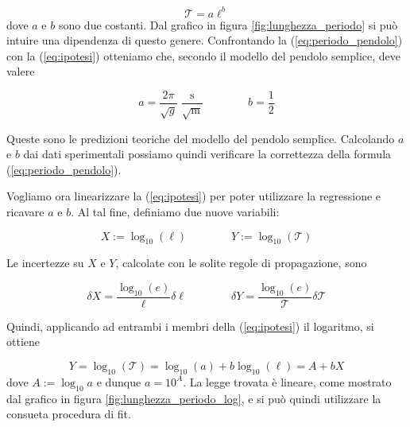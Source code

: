 \begin{equation}
    \mathcal{T} = a\ell^b
    \label{eq:ipotesi}
\end{equation}
%
dove $a$ e $b$ sono due costanti. Dal grafico in figura \ref{fig:lunghezza_periodo} si può intuire una dipendenza di questo genere.
Confrontando la (\ref{eq:periodo_pendolo}) con la (\ref{eq:ipotesi}) otteniamo che, secondo il modello
del pendolo semplice, deve valere

\begin{equation}
    a = \frac{2\pi}{\sqrt{g}} \; \frac{\text{s}}{\sqrt{\text{m}}} \qquad \qquad b = \frac{1}{2}
\end{equation}

Queste sono le predizioni teoriche del modello del pendolo semplice. Calcolando $a$ e $b$ dai dati sperimentali
possiamo quindi verificare la correttezza della formula (\ref{eq:periodo_pendolo}).

Vogliamo ora linearizzare la (\ref{eq:ipotesi}) per poter utilizzare la regressione e ricavare $a$ e $b$.
Al tal fine, definiamo due nuove variabili:

\begin{equation}
    X := \log_{10}{(\ell)} \qquad \qquad Y := \log_{10}{(\mathcal{T})}
    \label{eq:vars}
\end{equation}

Le incertezze su $X$ e $Y$, calcolate con le solite regole di propagazione, sono

\begin{equation}
    \delta X = \frac{\log_{10}(e)}{\ell}\delta \ell
    \qquad \qquad
    \delta Y = \frac{\log_{10}(e)}{\mathcal{T}}\delta\mathcal{T}
    \label{eq:delta_XY}
\end{equation}

Quindi, applicando ad entrambi i membri della (\ref{eq:ipotesi}) il logaritmo, si ottiene

\begin{equation}
    Y = \log_{10} (\mathcal{T}) = \log_{10} (a) + b \log_{10} (\ell) = A + b X
\end{equation}
%
dove $A := \log_{10} a$ e dunque $a = 10^A$. La legge trovata è lineare, come mostrato dal grafico
in figura \ref{fig:lunghezza_periodo_log}, e si può quindi utilizzare la consueta procedura di fit.


